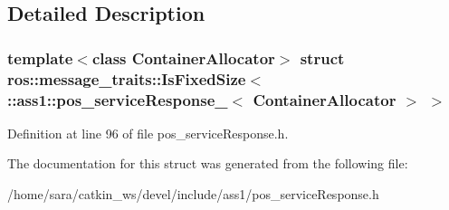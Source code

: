 \subsection{Detailed Description}
\subsubsection*{template$<$class Container\+Allocator$>$\newline
struct ros\+::message\+\_\+traits\+::\+Is\+Fixed\+Size$<$ \+::ass1\+::pos\+\_\+service\+Response\+\_\+$<$ Container\+Allocator $>$ $>$}



Definition at line 96 of file pos\+\_\+service\+Response.\+h.



The documentation for this struct was generated from the following file\+:\begin{DoxyCompactItemize}
\item 
/home/sara/catkin\+\_\+ws/devel/include/ass1/pos\+\_\+service\+Response.\+h\end{DoxyCompactItemize}
